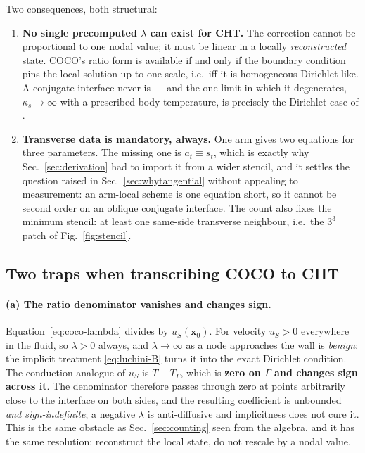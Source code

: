 \documentclass[11pt,a4paper]{article}
\begin{document}
Two consequences, both structural:
\begin{enumerate}
\item \textbf{No single precomputed $\lambda$ can exist for CHT.} The
      correction cannot be proportional to one nodal value; it must be linear
      in a locally \emph{reconstructed} state. COCO's ratio form is available
      if and only if the boundary condition pins the local solution up to one
      scale, i.e.\ iff it is homogeneous-Dirichlet-like. A conjugate interface
      never is --- and the one limit in which it degenerates,
      $\kappa_s\to\infty$ with a prescribed body temperature, is precisely the
      Dirichlet case of \cite{luchini2025}.
\item \textbf{Transverse data is mandatory, always.} One arm gives two
      equations for three parameters. The missing one is $a_t\equiv s_t$, which
      is exactly why Sec.~\ref{sec:derivation} had to import it from a wider
      stencil, and it settles the question raised in
      Sec.~\ref{sec:whytangential} without appealing to measurement: an
      arm-local scheme is one equation short, so it cannot be second order on
      an oblique conjugate interface. The count also fixes the minimum stencil:
      at least one same-side transverse neighbour, i.e.\ the $3^3$ patch of
      Fig.~\ref{fig:stencil}.
\end{enumerate}

\subsection{Two traps when transcribing COCO to CHT}
\label{sec:traps}

\paragraph{(a) The ratio denominator vanishes and changes sign.}
Equation~\eqref{eq:coco-lambda} divides by $u_S(\boldsymbol{x}_0)$. For velocity
$u_S>0$ everywhere in the fluid, so $\lambda>0$ always, and $\lambda\to\infty$
as a node approaches the wall is \emph{benign}: the implicit treatment
\eqref{eq:luchini-B} turns it into the exact Dirichlet condition. The
conduction analogue of $u_S$ is $T-T_\Gamma$, which is \textbf{zero on $\Gamma$
and changes sign across it}. The denominator therefore passes through zero at
points arbitrarily close to the interface on both sides, and the resulting
coefficient is unbounded \emph{and sign-indefinite}; a negative $\lambda$ is
anti-diffusive and implicitness does not cure it. This is the same obstacle as
Sec.~\ref{sec:counting} seen from the algebra, and it has the same resolution:
reconstruct the local state, do not rescale by a nodal value.
\end{document}
